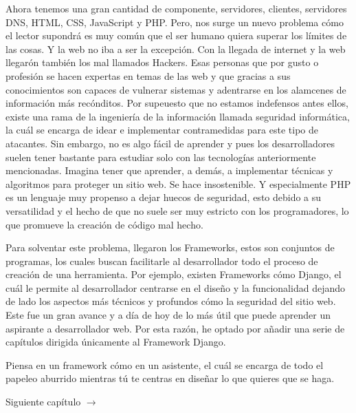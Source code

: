 \documentclass[12pt, letterpaper]{article}
\begin{document}
Ahora tenemos una gran cantidad de componente, servidores, clientes, servidores DNS, HTML, CSS, JavaScript y PHP. Pero, nos surge un nuevo problema
cómo el lector supondrá es muy común que el ser humano quiera superar los límites de las cosas. Y la web no iba a ser la excepción. Con la llegada de
internet y la web llegarón también los mal llamados Hackers. Esas personas que por gusto o profesión se hacen expertas en temas de las web y que
gracias a sus conocimientos son capaces de vulnerar sistemas y adentrarse en los alamcenes de información más recónditos. Por supeuesto que no estamos
indefensos antes ellos, existe una rama de la ingeniería de la información llamada seguridad informática, la cuál se encarga de idear e implementar
contramedidas para este tipo de atacantes. Sin embargo, no es algo fácil de aprender y pues los desarrolladores suelen tener bastante para estudiar
solo con las tecnologías anteriormente mencionadas. Imagina tener que aprender, a demás, a implementar técnicas y algoritmos para proteger un sitio web. 
Se hace insostenible. Y especialmente PHP es un lenguaje muy propenso a dejar huecos de seguridad, esto debido a su versatilidad y el hecho de que no
suele ser muy estricto con los programadores, lo que promueve la creación de código mal hecho.

Para solventar este problema, llegaron los Frameworks, estos son conjuntos de programas, los cuales buscan facilitarle al desarrollador todo el proceso
de creación de una herramienta. Por ejemplo, existen Frameworks cómo Django, el cuál le permite al desarrollador centrarse en el diseño y la funcionalidad
dejando de lado los aspectos más técnicos y profundos cómo la seguridad del sitio web. Este fue un gran avance y a día de hoy de lo más útil que puede
aprender un aspirante a desarrollador web. Por esta razón, he optado por añadir una serie de capítulos dirigida únicamente al Framework Django.

Piensa en un framework cómo en un asistente, el cuál se encarga de todo el papeleo aburrido mientras tú te centras en diseñar lo que quieres que se haga.

Siguiente capítulo $\rightarrow$
\end{document}
